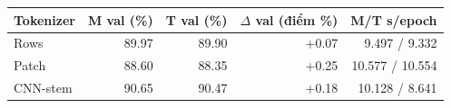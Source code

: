 \begin{tabular}{lrrrr}
\toprule
Tokenizer & M val (\%) & T val (\%) & $\Delta$ val (điểm \%) & M/T s/epoch\\
\midrule
Rows & 89.97 & 89.90 & +0.07 & 9.497 / 9.332\\
Patch & 88.60 & 88.35 & +0.25 & 10.577 / 10.554\\
CNN-stem & 90.65 & 90.47 & +0.18 & 10.128 / 8.641\\
\bottomrule
\end{tabular}
